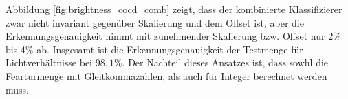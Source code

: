\newline
\newline
Abbildung \ref{fig:brightness_cocd_comb} zeigt, dass der kombinierte Klassifizierer zwar nicht invariant gegenüber Skalierung und dem Offset ist, aber die Erkennungsgenauigkeit nimmt mit zunehmender
Skalierung bzw. Offset nur 2\% bis 4\% ab. Insgesamt ist die Erkennungsgenauigkeit der Testmenge für Lichtverhältnisse bei $98,1\%$.
\newline
\newline
Der Nachteil dieses Ansatzes ist, dass sowhl die Fearturmenge mit Gleitkommazahlen, als auch für Integer berechnet werden muss.
